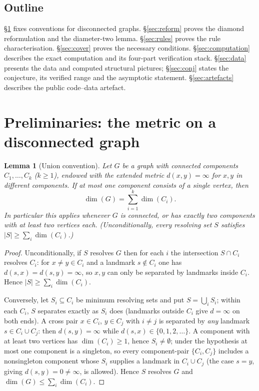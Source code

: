 \documentclass[12pt]{article}
\newtheorem{lemma}[theorem]{Lemma}
\theoremstyle{definition}
\begin{document}
\subsection*{Outline}
\S\ref{sec:prelims} fixes conventions for disconnected graphs. \S\ref{sec:reform} proves the diamond reformulation and the diameter-two lemma. \S\ref{sec:rules} proves the rule characterisation. \S\ref{sec:cover} proves the necessary conditions. \S\ref{sec:computation} describes the exact computation and its four-part verification stack. \S\ref{sec:data} presents the data and computed structural pictures; \S\ref{sec:conj} states the conjecture, its verified range and the asymptotic statement. \S\ref{sec:artefacts} describes the public code--data artefact.

\section{Preliminaries: the metric on a disconnected graph}\label{sec:prelims}

\begin{lemma}[Union convention]\label{lem:union}
Let $G$ be a graph with connected components $C_1,\dots,C_k$ ($k\ge1$), endowed with the extended metric $d(x,y)=\infty$ for $x,y$ in different components. If at most one component consists of a single vertex, then
\[
\dim(G)=\sum_{i=1}^{k}\dim(C_i).
\]
In particular this applies whenever $G$ is connected, or has exactly two components with at least two vertices each. (Unconditionally, every resolving set $S$ satisfies $|S|\ge\sum_i\dim(C_i)$.)
\end{lemma}

\begin{proof}
Unconditionally, if $S$ resolves $G$ then for each $i$ the intersection $S\cap C_i$ resolves $C_i$: for $x\neq y\in C_i$ and a landmark $s\notin C_i$ one has $d(s,x)=d(s,y)=\infty$, so $x,y$ can only be separated by landmarks inside $C_i$. Hence $|S|\ge\sum_i\dim(C_i)$.

Conversely, let $S_i\subseteq C_i$ be minimum resolving sets and put $S=\bigcup_i S_i$; within each $C_i$, $S$ separates exactly as $S_i$ does (landmarks outside $C_i$ give $d=\infty$ on both ends). A cross pair $x\in C_i$, $y\in C_j$ with $i\ne j$ is separated by \emph{any} landmark $s\in C_i\cup C_j$: then $d(s,y)=\infty$ while $d(s,x)\in\{0,1,2,\dots\}$. A component with at least two vertices has $\dim(C_i)\ge1$, hence $S_i\ne\emptyset$; under the hypothesis at most one component is a singleton, so every component-pair $\{C_i,C_j\}$ includes a nonsingleton component whose $S_i$ supplies a landmark in $C_i\cup C_j$ (the case $s=y$, giving $d(s,y)=0\ne\infty$, is allowed). Hence $S$ resolves $G$ and $\dim(G)\le\sum_i\dim(C_i)$.
\end{proof}
\end{document}

